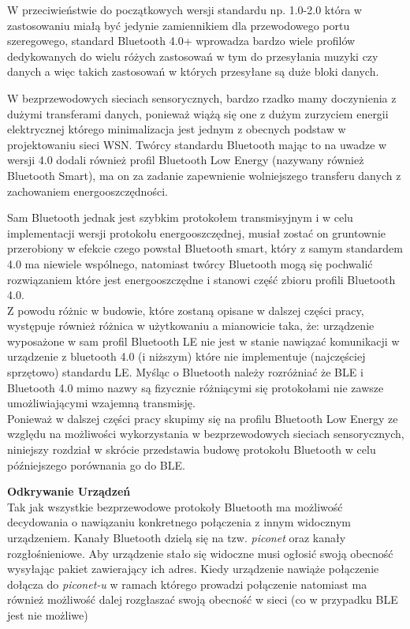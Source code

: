\par W przeciwieństwie do początkowych wersji standardu np. 1.0-2.0 która w zastosowaniu miałą być jedynie zamiennikiem dla przewodowego portu szeregowego, standard Bluetooth 4.0+ wprowadza bardzo wiele profilów dedykowanych do wielu różych zastosowań w tym do przesyłania muzyki czy danych a więc takich zastosowań w których przesyłane są duże bloki danych. \\
\par W bezprzewodowych sieciach sensorycznych, bardzo rzadko mamy doczynienia z dużymi transferami danych, ponieważ wiążą się one z dużym zurzyciem energii elektrycznej którego minimalizacja jest jednym z obecnych podstaw w projektowaniu sieci WSN. Twórcy standardu Bluetooth mając to na uwadze w wersji 4.0 dodali również profil Bluetooth Low Energy (nazywany również Bluetooth Smart), ma on za zadanie zapewnienie wolniejszego transferu danych z zachowaniem energooszczędności. \\
\par Sam Bluetooth jednak jest szybkim protokołem transmisyjnym i w celu implementacji wersji protokołu energooszczędnej, musiał zostać on gruntownie przerobiony w efekcie czego powstał Bluetooth smart, który z samym standardem 4.0 ma niewiele wspólnego, natomiast twórcy Bluetooth mogą się pochwalić rozwiązaniem które jest energooszczędne i stanowi część zbioru profili Bluetooth 4.0. \\
Z powodu różnic w budowie, które zostaną opisane w dalszej części pracy, występuje również różnica w użytkowaniu a mianowicie taka, że: urządzenie wyposażone w sam profil Bluetooth LE nie jest w stanie nawiązać komunikacji w urządzenie z bluetooth 4.0 (i niższym) które nie implementuje (najczęściej sprzętowo) standardu LE. Myśląc o Bluetooth należy rozróżniać że BLE i Bluetooth 4.0 mimo nazwy są fizycznie różniącymi się protokołami nie zawsze umożliwiającymi wzajemną transmisję. \\
Ponieważ w dalszej części pracy skupimy się na profilu Bluetooth Low Energy ze względu na możliwości wykorzystania w bezprzewodowych sieciach sensorycznych, niniejszy rozdział w skrócie przedstawia budowę protokołu Bluetooth w celu późniejszego porównania go do BLE. \\

\par 
\tab \textbf{Odkrywanie Urządzeń} \\
Tak jak wszystkie bezprzewodowe protokoły Bluetooth ma możliwość decydowania o nawiązaniu konkretnego połączenia z innym widocznym urządzeniem. Kanały Bluetooth dzielą się na tzw. \textit{piconet} oraz kanały rozgłośnieniowe. Aby urządzenie stało się widoczne musi ogłosić swoją obecność wysyłając pakiet zawierający ich adres. Kiedy urządzenie nawiąże połączenie dołącza do \textit{piconet-u} w ramach którego prowadzi połączenie natomiast ma również możliwość dalej rozgłaszać swoją obecność w sieci (co w przypadku BLE jest nie możliwe) \\

